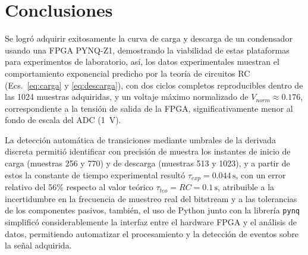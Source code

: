 \documentclass[conference]{IEEEtran}
\begin{document}
\section{Conclusiones}

Se logró adquirir exitosamente la curva de carga y descarga de un condensador
usando una FPGA PYNQ-Z1, demostrando la viabilidad de estas plataformas para
experimentos de laboratorio, así, los datos experimentales muestran el comportamiento
exponencial predicho por la teoría de circuitos RC (Ecs.~\ref{eq:carga}
y \ref{eq:descarga}), con dos ciclos completos reproducibles dentro de las 1024
muestras adquiridas, y un voltaje máximo normalizado de $V_{norm} \approx 0.176$,
correspondiente a la tensión de salida de la FPGA, significativamente menor al
fondo de escala del ADC (1~V).

La detección automática de transiciones mediante
umbrales de la derivada discreta permitió identificar con precisión de muestra
los instantes de inicio de carga (muestras 256 y 770) y de descarga (muestras 513
y 1023), y a partir de estos la constante de tiempo experimental resultó
$\tau_{exp} = 0.044\,\text{s}$, con un error relativo del 56\% respecto al valor
teórico $\tau_{teo} = RC = 0.1\,\text{s}$, atribuible a la incertidumbre en la
frecuencia de muestreo real del bitstream y a las tolerancias de los componentes
pasivos, también, el uso de Python junto con la librería \texttt{pynq} simplificó
considerablemente la interfaz entre el hardware FPGA y el análisis de datos,
permitiendo automatizar el procesamiento y la detección de eventos sobre la señal
adquirida.



\end{document}
